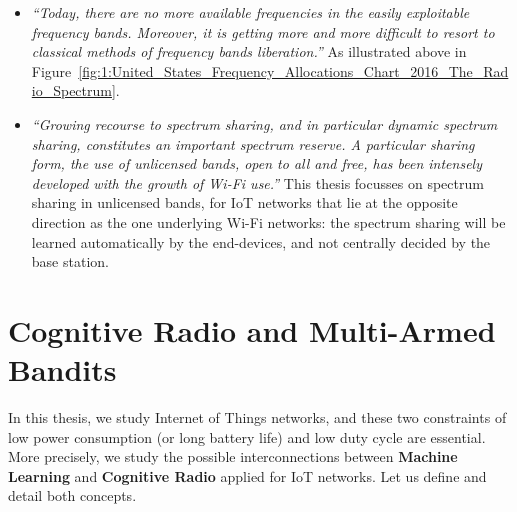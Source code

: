 \begin{itemize}
    \item
    \emph{``Today, there are no more available frequencies in the easily exploitable frequency bands.
    Moreover, it is getting more and more difficult to resort to classical methods of frequency bands liberation.''}
    As illustrated above in Figure~\ref{fig:1:United_States_Frequency_Allocations_Chart_2016_The_Radio_Spectrum}.
    \item
    \emph{``Growing recourse to spectrum sharing, and in particular dynamic spectrum sharing, constitutes an important spectrum reserve.
    A particular sharing form, the use of unlicensed bands, open to all and free, has been intensely developed with the growth of Wi-Fi use.''}
    This thesis focusses on spectrum sharing in unlicensed bands, for IoT networks that lie at the opposite direction as the one underlying Wi-Fi networks: the spectrum sharing will be learned automatically by the end-devices, and not centrally decided by the base station.
\end{itemize}


\section{Cognitive Radio and Multi-Armed Bandits}

In this thesis, we study Internet of Things networks, and these two constraints of low power consumption (or long battery life) and low duty cycle are essential.
More precisely, we study the possible interconnections between \textbf{Machine Learning} and \textbf{Cognitive Radio} applied for IoT networks.
Let us define and detail both concepts.




